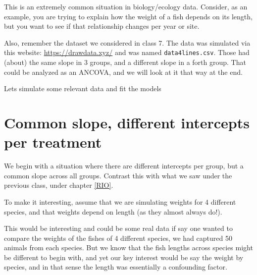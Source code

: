 \documentclass[
]{book}
\begin{document}
This is an extremely common situation in biology/ecology data. Consider, as an example, you are trying to explain how the weight of a fish depends on its length, but you want to see if that relationship changes per year or site.

Also, remember the dataset we considered in class 7. The data was simulated via this website: \url{https://drawdata.xyz/} and was named \texttt{data4lines.csv}. Those had (about) the same slope in 3 groups, and a different slope in a forth group. That could be analyzed as an ANCOVA, and we will look at it that way at the end.

Lets simulate some relevant data and fit the models

\hypertarget{common-slope-different-intercepts-per-treatment}{%
\section{Common slope, different intercepts per treatment}\label{common-slope-different-intercepts-per-treatment}}

We begin with a situation where there are different intercepts per group, but a common slope across all groups. Contrast this with what we saw under the previous class, under chapter \ref{RIO}.

To make it interesting, assume that we are simulating weights for 4 different species, and that weights depend on length (as they almost always do!).

This would be interesting and could be some real data if say one wanted to compare the weights of the fishes of 4 different species, we had captured 50 animals from each species. But we know that the fish lengths across species might be different to begin with, and yet our key interest would be say the weight by species, and in that sense the length was essentially a confounding factor.
\end{document}
